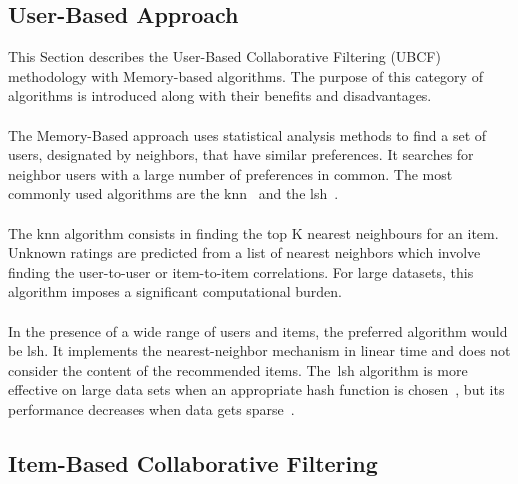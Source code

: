\subsection{User-Based Approach}
\label{subsec:userBasedCF}
This Section describes the User-Based Collaborative Filtering (UBCF) methodology with Memory-based algorithms. The purpose of this category of algorithms is introduced along with their benefits and disadvantages.\\
\\
The Memory-Based approach uses statistical analysis methods to find a set of users, designated by neighbors, that have similar preferences. It searches for neighbor users with a large number of preferences in common. The most commonly used algorithms are the \gls{knn}~\cite{Aha91}\cite{Duda_Book} and the \gls{lsh}~\cite{neighborhoodCF}.\\
\\
The \gls{knn} algorithm consists in finding the top K nearest neighbours for an item. Unknown ratings are predicted from a list of nearest neighbors which involve finding the user-to-user or item-to-item correlations. For large datasets, this algorithm imposes a significant computational burden.\\
\\
In the presence of a wide range of users and items, the preferred algorithm would be \gls{lsh}. It implements the nearest-neighbor mechanism in linear time and does not consider the content of the recommended items. The~\gls{lsh} algorithm is more effective on large data sets when an appropriate hash function is chosen~\cite{googleScalableCF}, but its performance decreases when data gets sparse~\cite{ibCollabrativeVSGK}.

\subsection{Item-Based Collaborative Filtering}

